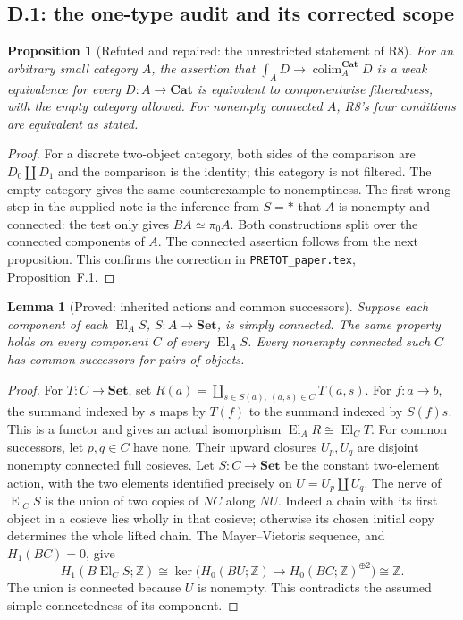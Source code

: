 \documentclass[11pt,a4paper]{article}
\newcommand{\Set}{\mathbf{Set}}
\newcommand{\Cat}{\mathbf{Cat}}
\newcommand{\Z}{\mathbb Z}
\newcommand{\El}{\operatorname{El}}
\newcommand{\colim}{\operatorname*{colim}}
\newtheorem{proposition}[theorem]{Proposition}
\newtheorem{lemma}[theorem]{Lemma}
\theoremstyle{definition}
\begin{document}
\subsection{D.1: the one-type audit and its corrected scope}
\begin{proposition}[Refuted and repaired: the unrestricted statement of R8]\label{D:R8-scope}
For an arbitrary small category $A$, the assertion that
$\int_A D\to\colim_A^{\Cat}D$ is a weak equivalence for every
$D:A\to\Cat$ is equivalent to componentwise filteredness, with the
empty category allowed. For nonempty connected $A$, R8's four
conditions are equivalent as stated.
\end{proposition}
\begin{proof}
For a discrete two-object category, both sides of the comparison are
$D_0\amalg D_1$ and the comparison is the identity; this category is
not filtered. The empty category gives the same counterexample to
nonemptiness. The first wrong step in the supplied note is the
inference from $S=*$ that $A$ is nonempty and connected: the test
only gives $BA\simeq\pi_0A$. Both constructions split over the
connected components of $A$. The connected assertion follows from
the next proposition. This confirms the correction in
\texttt{PRETOT\_paper.tex}, Proposition~F.1.
\end{proof}

\begin{lemma}[Proved: inherited actions and common successors]\label{D:inherit-common}
Suppose each component of each $\El_A S$, $S:A\to\Set$, is simply
connected. The same property holds on every component $C$ of every
$\El_A S$. Every nonempty connected such $C$ has common successors
for pairs of objects.
\end{lemma}
\begin{proof}
For $T:C\to\Set$, set
$R(a)=\coprod_{s\in S(a),\ (a,s)\in C}T(a,s)$.
For $f:a\to b$, the summand indexed by $s$ maps by $T(f)$ to the
summand indexed by $S(f)s$. This is a functor and gives an actual
isomorphism $\El_A R\cong\El_C T$.
For common successors, let $p,q\in C$ have none. Their upward
closures $U_p,U_q$ are disjoint nonempty connected full cosieves.
Let $S:C\to\Set$ be the constant two-element action, with the two
elements identified precisely on $U=U_p\amalg U_q$.
The nerve of $\El_C S$ is the union of two copies of $NC$ along
$NU$. Indeed a chain with its first object in a cosieve lies wholly
in that cosieve; otherwise its chosen initial copy determines the
whole lifted chain. The Mayer--Vietoris sequence, and $H_1(BC)=0$,
give
\[
H_1(B\El_C S;\Z)\cong
\ker\bigl(H_0(BU;\Z)\longrightarrow H_0(BC;\Z)^{\oplus2}\bigr)
\cong\Z.
\]
The union is connected because $U$ is nonempty. This contradicts
the assumed simple connectedness of its component.
\end{proof}
\end{document}
